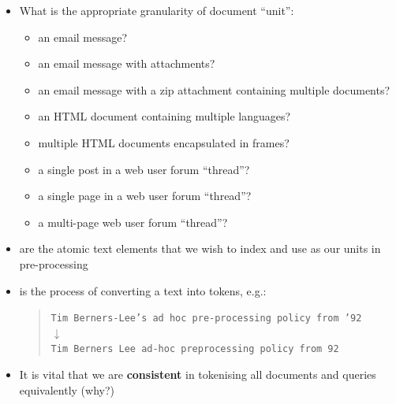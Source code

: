 \documentclass[a4paper,landscape,headrule,footrule,xetex]{foils}
\begin{document}
\begin{itemize}
\item What is the appropriate granularity of document ``unit'':
  \begin{itemize}
  \item an email message?
  \item an email message with attachments?
  \item an email message with a zip attachment containing multiple documents?
  \item an HTML document containing multiple languages?
  \item multiple HTML documents encapsulated in frames?
  \item a single post in a web user forum ``thread''?
  \item a single page in a web user forum ``thread''?
  \item a multi-page web user forum ``thread''?
  \end{itemize}
\end{itemize}








\begin{itemize}
\item {} are the atomic text elements that we wish to
  index and use as our units in pre-processing
\item {} is the process of converting a text into tokens, e.g.:
  \begin{quote}
    \texttt{Tim Berners-Lee's ad hoc pre-processing policy from '92}\\
    \hspace*{7cm}$\downarrow$\\
    \texttt{Tim Berners Lee ad-hoc preprocessing policy from 92}\\
  \end{quote}
\item It is vital that we are \textbf{consistent} in tokenising all
  documents and queries equivalently (why?)
\end{itemize}






\end{document}
